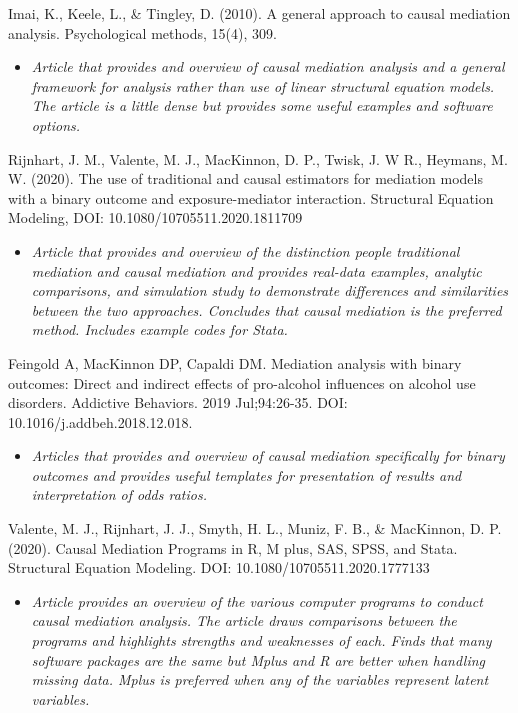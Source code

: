 \documentclass[
]{book}
\providecommand{\tightlist}{%
  \setlength{\itemsep}{0pt}\setlength{\parskip}{0pt}}
\begin{document}
Imai, K., Keele, L., \& Tingley, D. (2010). A general approach to causal mediation analysis. Psychological methods, 15(4), 309.

\begin{itemize}
\tightlist
\item
  \emph{Article that provides and overview of causal mediation analysis and a general framework for analysis rather than use of linear structural equation models. The article is a little dense but provides some useful examples and software options. }
\end{itemize}

Rijnhart, J. M., Valente, M. J., MacKinnon, D. P., Twisk, J. W R., Heymans, M. W. (2020). The use of traditional and causal estimators for mediation models with a binary outcome and exposure-mediator interaction. Structural Equation Modeling, DOI: 10.1080/10705511.2020.1811709

\begin{itemize}
\tightlist
\item
  \emph{Article that provides and overview of the distinction people traditional mediation and causal mediation and provides real-data examples, analytic comparisons, and simulation study to demonstrate differences and similarities between the two approaches. Concludes that causal mediation is the preferred method. Includes example codes for Stata. }
\end{itemize}

Feingold A, MacKinnon DP, Capaldi DM. Mediation analysis with binary outcomes: Direct and indirect effects of pro-alcohol influences on alcohol use disorders. Addictive Behaviors. 2019 Jul;94:26-35. DOI: 10.1016/j.addbeh.2018.12.018.

\begin{itemize}
\tightlist
\item
  \emph{Articles that provides and overview of causal mediation specifically for binary outcomes and provides useful templates for presentation of results and interpretation of odds ratios.}
\end{itemize}

Valente, M. J., Rijnhart, J. J., Smyth, H. L., Muniz, F. B., \& MacKinnon, D. P. (2020). Causal Mediation Programs in R, M plus, SAS, SPSS, and Stata. Structural Equation Modeling. DOI: 10.1080/10705511.2020.1777133

\begin{itemize}
\tightlist
\item
  \emph{Article provides an overview of the various computer programs to conduct causal mediation analysis. The article draws comparisons between the programs and highlights strengths and weaknesses of each. Finds that many software packages are the same but Mplus and R are better when handling missing data. Mplus is preferred when any of the variables represent latent variables.}
\end{itemize}
\end{document}
